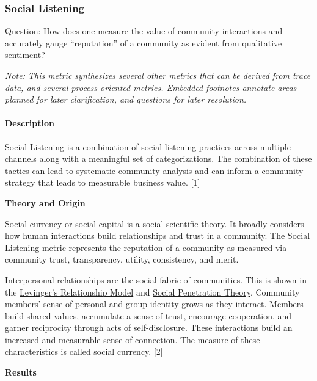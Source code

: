 \hypertarget{social-listening}{%
\subsubsection{Social Listening}\label{social-listening}}

Question: How does one measure the value of community interactions and
accurately gauge ``reputation'' of a community as evident from
qualitative sentiment?

\emph{Note: This metric synthesizes several other metrics that can be
derived from trace data, and several process-oriented metrics. Embedded
footnotes annotate areas planned for later clarification, and questions
for later resolution.}

\hypertarget{description}{%
\paragraph{Description}\label{description}}

Social Listening is a combination of
\href{https://blog.hubspot.com/service/social-listening}{social
listening} practices across multiple channels along with a meaningful
set of categorizations. The combination of these tactics can lead to
systematic community analysis and can inform a community strategy that
leads to measurable business value. {[}1{]}

\textbf{Theory and Origin}

Social currency or social capital is a social scientific theory. It
broadly considers how human interactions build relationships and trust
in a community. The Social Listening metric represents the reputation of
a community as measured via community trust, transparency, utility,
consistency, and merit.

Interpersonal relationships are the social fabric of communities. This
is shown in the
\href{https://theadminzone.com/ams/levingers-stage-theory.1272/}{Levinger's
Relationship Model} and
\href{https://psycnet.apa.org/record/1973-28661-000}{Social Penetration
Theory}. Community members' sense of personal and group identity grows
as they interact. Members build shared values, accumulate a sense of
trust, encourage cooperation, and garner reciprocity through acts of
\href{https://en.wikipedia.org/wiki/Self-disclosure}{self-disclosure}.
These interactions build an increased and measurable sense of
connection. The measure of these characteristics is called social
currency. {[}2{]}

\textbf{Results}

